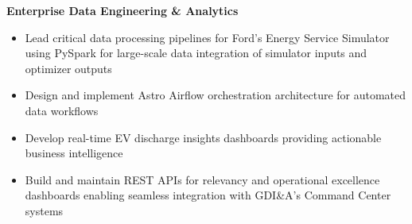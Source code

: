 \documentclass[11pt,a4paper]{article}
\begin{document}
\noindent\textbf{Enterprise Data Engineering \& Analytics}
\begin{itemize}
    \item Lead critical data processing pipelines for Ford's Energy Service Simulator using PySpark for large-scale data integration of simulator inputs and optimizer outputs
    \item Design and implement Astro Airflow orchestration architecture for automated data workflows
    \item Develop real-time EV discharge insights dashboards providing actionable business intelligence
    \item Build and maintain REST APIs for relevancy and operational excellence dashboards enabling seamless integration with GDI\&A's Command Center systems
\end{itemize}
\end{document}
